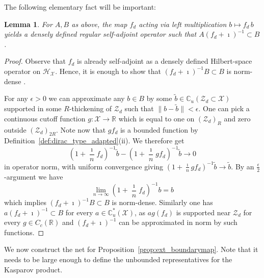 \documentclass[12pt]{amsart}
\newtheorem{lemma}[theorem]{Lemma}
\newcommand{\CM}{{\mathbb C}}
\newcommand{\RM}{{\mathbb R}}
\newcommand{\Hh}{{\mathcal H}}
\newcommand{\Xx}{{\mathcal X}}
\newcommand{\Zz}{{\mathcal Z}}
\begin{document}
The following elementary fact will be important:
\begin{lemma}
\label{lem:Mfd_multiplier}
For $A,B$ as above, the map $f_d$ acting via left multiplication $b \mapsto {f_d}\, b$ yields a densely defined regular self-adjoint operator such that $A({f_d}+\imath)^{-1}\subset B$.
\end{lemma}
\begin{proof}
Observe that ${f_d}$ is already self-adjoint as a densely defined Hilbert-space operator on $\Hh_\Xx$.
Hence, it is enough to show that $({f_d}+\imath)^{-1}B\subset B$ is norm-dense \cite[Lemma 2.6]{KSt}.

For any $\epsilon>0$ we can approximate any $b\in B$ by some $\tilde{b}\in \CM_u(\Zz_d\subset \Xx)$ supported in some $R$-thickening of $\Zz_d$ such that $\|b-\tilde{b}\|<\epsilon$. One can pick a continuous cutoff function $g:\Xx\to \RM$ which is equal to one on $(\Zz_d)_R$ and zero outside $(\Zz_d)_{2R}$. Note now that $g f_d$ is a bounded function by Definition~\ref{def:dirac_type_adapted}(ii). We therefore get
$$\left(1+ \frac{\imath}{n}{f_d}\right)^{-1} \tilde{b} - \left(1+ \frac{\imath}{n}{g f_d}\right)^{-1} \tilde{b} \longrightarrow 0$$
in operator norm, with uniform convergence giving $\left(1+ \frac{\imath}{n}{g f_d}\right)^{-1} \tilde{b} \longrightarrow \tilde{b}$. By an $\frac{\epsilon}{2}$-argument we have
$$\lim_{n\to \infty} \left(1+ \frac{\imath}{n}{f_d}\right)^{-1} b = b$$
which implies $(f_d + \imath)^{-1}B \subset B$ is norm-dense. Similarly one has $a({f_d}+\imath)^{-1}\subset B$ for every $a\in \CM_u^*(\Xx)$, as $a g(f_d)$ is supported near $\Zz_d$ for every $g\in C_c(\RM)$ and $({f_d}+\imath)^{-1}$ can be approximated in norm by such functions.
\end{proof}

We now construct the net for Proposition~\ref{prop:ext_boundarymap}. Note that it needs to be large enough to define the unbounded representatives for the Kasparov product.
\end{document}
